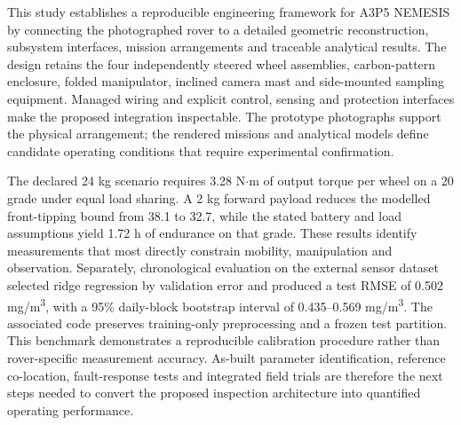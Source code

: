 \documentclass[11pt,a4paper]{article}
\begin{document}
This study establishes a reproducible engineering framework for A3P5 NEMESIS by connecting the photographed rover to a detailed geometric reconstruction, subsystem interfaces, mission arrangements and traceable analytical results. The design retains the four independently steered wheel assemblies, carbon-pattern enclosure, folded manipulator, inclined camera mast and side-mounted sampling equipment. Managed wiring and explicit control, sensing and protection interfaces make the proposed integration inspectable. The prototype photographs support the physical arrangement; the rendered missions and analytical models define candidate operating conditions that require experimental confirmation.

The declared 24 kg scenario requires 3.28 N\ensuremath{\cdot}m of output torque per wheel on a 20\textdegree{} grade under equal load sharing. A 2 kg forward payload reduces the modelled front-tipping bound from 38.1\textdegree{} to 32.7\textdegree{}, while the stated battery and load assumptions yield 1.72 h of endurance on that grade. These results identify measurements that most directly constrain mobility, manipulation and observation. Separately, chronological evaluation on the external sensor dataset selected ridge regression by validation error and produced a test RMSE of 0.502 mg/m\textsuperscript{3}, with a 95\% daily-block bootstrap interval of 0.435--0.569 mg/m\textsuperscript{3}. The associated code preserves training-only preprocessing and a frozen test partition. This benchmark demonstrates a reproducible calibration procedure rather than rover-specific measurement accuracy. As-built parameter identification, reference co-location, fault-response tests and integrated field trials are therefore the next steps needed to convert the proposed inspection architecture into quantified operating performance.

\FloatBarrier
\end{document}
